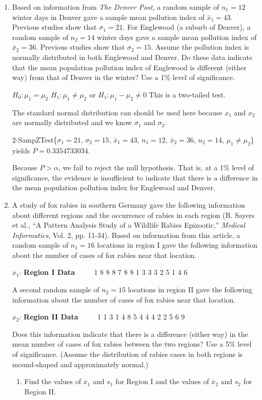 \documentclass{article}
\newcommand{\answer}[1]{\color{red}#1}
\begin{document}
\begin{enumerate}

\item Based on information from {\em The Denver Post}, a random sample of $n_1 = 12$ winter days in Denver gave a sample mean pollution index of $\bar{x}_1= 43$.  Previous studies show that $\sigma_1 = 21$. For Englewood (a suburb of Denver), a random sample of $n_2=14$ winter days gave a sample mean pollution index of $\bar{x}_2 = 36$.  Previous studies show that $\sigma_2 = 15$.  Assume the pollution index is normally distributed in both Englewood and Denver.  Do these data indicate that the mean population pollution index of Englewood is different (either way) from that of Denver in the winter?  Use a 1\% level of significance.  
	
{\answer 
$H_0: \mu_1 = \mu_2$  
$H_1: \mu_1 \neq \mu_2$  or $H_1: \mu_1 - \mu_2 \neq 0$ 
This is a two-tailed test.  
	
The standard normal distribution can should be used here because $x_1$ and $x_2$ are normally distributed and we know $\sigma_1$ and $\sigma_2$.  

2-SampZTest\{$\sigma_1 = 21$, $\sigma_2 = 15$, $\bar{x}_1 = 43$, $n_1 = 12$, $\bar{x}_2 = 36$, $n_2 = 14$, $\mu_1 \neq \mu_2$\} yields $P = 0.3354733034$.  

Because $P > \alpha$, we fail to reject the null hypothesis. That is, at a 1\% level of significance, the evidence is insufficient to indicate that there is a difference in the mean population pollution index for Englewood and Denver.  
} 
\vfill 

\newpage

\item A study of fox rabies in southern Germany gave the following information about different regions and the occurrence of rabies in each region (B. Sayers et al., ``A Pattern Analysis Study of a Wildlife Rabies Epizootic,'' {\it Medical Informatics}, Vol. 2, pp. 11-34). Based on information from this article, a random sample of $n_1=16$ locations in region I gave the following information about the number of cases of fox rabies near that location.
\begin{center} $x_1$: {\bf Region I Data} $\qquad$ 1 8 8 8 7 8 8 1 3 3 3 2 5 1 4 6 \end{center}
A second random sample of $n_2=15$ locations in region II gave the following information about the number of cases of fox rabies near that location.
\begin{center}$x_2$: {\bf Region II Data} $\qquad$ 1 1 3 1 4 8 5 4 4 4 2 2 5 6 9 \end{center}
Does this information indicate that there is a difference (either way) in the mean number of cases of fox rabies between the two regions? Use a 5\% level of significance. (Assume the distribution of rabies cases in both regions is mound-shaped and approximately normal.)
	\begin{enumerate}
	\item Find the values of $\overline{x}_1$ and $s_1$ for Region I and the values of $\overline{x}_2$ and $s_2$ for Region II.  
	

\end{enumerate}
\end{enumerate}
\end{document}

